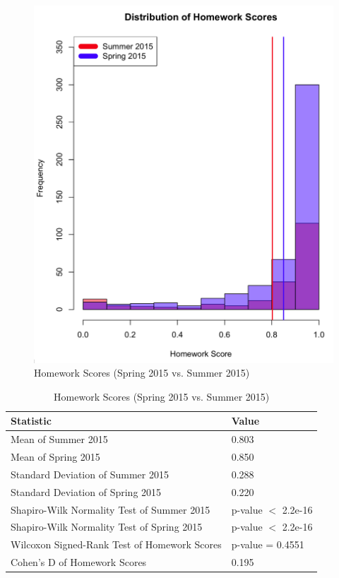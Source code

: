 \begin{figure}
	\centering
	\includegraphics[width=5in]{img/chapter4/hw_su15_vs_sp15}
	\caption[Homework Scores (Spring 2015 vs. Summer 2015)]{Homework Scores (Spring 2015 vs. Summer 2015)}
  \label{fig:hwSu14Su15}
\end{figure}

\begin{small}
\begin{table}
  \centering
  \begin{tabular}{|l|l|}
    \hline
    \textbf{Statistic} & \textbf{Value} \\
	\hline
	Mean of Summer 2015 & 0.803 \\
	\hline
	Mean of Spring 2015 & 0.850 \\
	\hline
	Standard Deviation of Summer 2015 & 0.288 \\
	\hline
	Standard Deviation of Spring 2015 & 0.220 \\
	\hline
	Shapiro-Wilk Normality Test of Summer 2015 & p-value $<$ 2.2e-16 \\
	\hline
	Shapiro-Wilk Normality Test of Spring 2015 & p-value $<$ 2.2e-16 \\
	\hline
	Wilcoxon Signed-Rank Test of Homework Scores & p-value = 0.4551 \\
	\hline
	Cohen's D of Homework Scores & 0.195 \\
	\hline
  \end{tabular}
	\caption[Homework Scores (Spring 2015 vs. Summer 2015)]{Homework Scores (Spring 2015 vs. Summer 2015)}
  \label{fig:hwSu14Su15}
\end{table}
\end{small}

